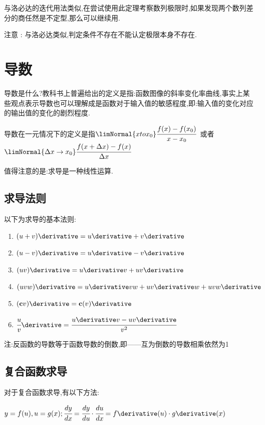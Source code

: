 {{{{      与洛必达的迭代用法类似,在尝试使用此定理考察数列极限时,如果发现两个数列差分的商任然是不定型,那么可以继续用.

      注意 : 与洛必达类似,判定条件不存在不能认定极限本身不存在.
    }%

  }%

 }%

\section{导数}{
  导数是什么?教科书上普遍给出的定义是指:函数图像的斜率变化率曲线,事实上某些观点表示导数也可以理解成是函数对于输入值的敏感程度,即:输入值的变化对应的输出值的变化的剧烈程度.

  导数在一元情况下的定义是指$\limNormal{x to x_0}\cfrac{f(x) - f(x_0)}{x - x_0}$\ 或者\ $\limNormal{\Delta x \to x_0}\cfrac{f(x + \Delta x) - f(x)}{\Delta x}$

  值得注意的是:求导是一种线性运算.

  \subsection{求导法则}{
    以下为求导的基本法则:
    \begin{enumerate}
      \item $(u + v)\derivative = u\derivative + v\derivative$
      \item $(u - v)\derivative = u\derivative - v\derivative$
      \item $(uv)\derivative = u\derivative v + uv\derivative$
      \item $(uvw)\derivative = u\derivative vw + uv\derivative w + uvw\derivative$
      \item $(\mathbf{c}v)\derivative = \mathbf{c}(v)\derivative$
      \item $\cfrac{u}{v}\derivative = \cfrac{u\derivative v - uv\derivative}{v^2}$
    \end{enumerate}
    注:反函数的导数等于函数导数的倒数,即——互为倒数的导数相乘依然为1
  }%

  \subsection{复合函数求导}{
    对于复合函数求导,有以下方法:

    $y = f(u), u = g(x); \cfrac{dy}{dx} = \cfrac{dy}{du} \cdot \cfrac{du}{dx} = f\derivative(u) \cdot g\derivative(x)$
  }%

}}
